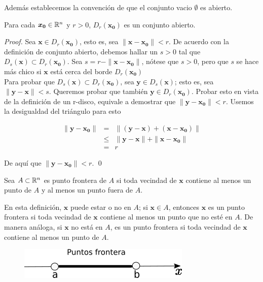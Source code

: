 Además establecemos la convención de que el conjunto vacio $\emptyset$ es abierto.

\begin{theorem}
    Para cada $\bm{x_{0}} \in \mathbb{R}^{n}$ y $r > 0$, $D_{r}(\bm{x_{0}})$ es un conjunto abierto.
\end{theorem}

\begin{proof}
    Sea $\bm{x} \in D_{r}(\bm{x_{0}})$, esto es, sea $\|\bm{x} - \bm{x_{0}}\| < r$. De acuerdo con la definición
    de conjunto abierto, debemos hallar un $s > 0$ tal que $D_{s}(\bm{x}) \subset  D_{r}(\bm{x_{0}})$.
    Sea $s = r - \|\bm{x} - \bm{x_{0}}\|$, nótese que $s > 0$, pero que $s$ se hace más chico si $\bm{x}$ está
    cerca del borde $D_{r}(\bm{x_{0}})$ \\

    Para probar que $D_{s}(\bm{x}) \subset D_{r}(\bm{x_{0}})$, sea $\bm{y} \in D_{s}(\bm{x})$; esto es, sea
    $\|\bm{y} - \bm{x}\| < s$. Queremos probar que también $\bm{y} \in D_{r}(\bm{x_{0}})$. Probar esto en vista
    de la definición de un r-disco, equivale a demostrar que $\|\bm{y} -\bm{x_{0}}\| < r$. Usemos la desigualdad
    del triángulo para esto

    \begin{eqnarray*}
        \|\bm{y} - \bm{x_{0}}\| &=& \|(\bm{y} - \bm{x}) + (\bm{x} - \bm{x_{0}})\| \\
                              &\le& \|\bm{y} - \bm{x}\| + \|\bm{x} - \bm{x_{0}}\| \\
                              &=& r
    \end{eqnarray*}

    De aquí que $\|\bm{y} - \bm{x_{0}}\| < r$. \qed

\end{proof}

\begin{definition}
    Sea $A \subset \mathbb{R}^{n}$ es punto frontera de $A$ si toda vecindad de $\bm{x}$ contiene al menos un punto de $A$ y al menos un punto fuera de $A$.
\end{definition}

En esta definición, $\bm{x}$ puede estar o no en $A$; si $\bm{x} \in A$, entonces $\bm{x}$ es un punto frontera si toda vecindad de $\bm{x}$ contiene al menos un punto
que no esté en $A$. De manera análoga, si $\bm{x}$ no está en $A$, es un punto frontera si toda vecindad de
$\bm{x}$ contiene al menos un punto de $A$.

\begin{figure}[!ht]
  \begin{center}
      \includegraphics[width=0.5\linewidth]{gfx/puntos-frontera}
      \caption{}
      \label{fig:boat1}
  \end{center}
\end{figure}


